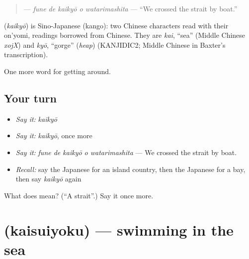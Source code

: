 \begin{quote}
\textbf{  } — \emph{fune de kaikyō o watarimashita} — \textquotedblleft{}We crossed the strait by boat.\textquotedblright{}
\end{quote}

\begin{cousinweb}
\textbf{} (\emph{kaikyō}) is Sino-Japanese (kango): two Chinese characters read with their on'yomi, readings borrowed from Chinese. They are \emph{kai}, \textquotedblleft{}sea\textquotedblright{} (Middle Chinese \emph{xojX}) and \emph{kyō}, \textquotedblleft{}gorge\textquotedblright{} (\emph{heap}) (KANJIDIC2; Middle Chinese in Baxter's transcription).
\end{cousinweb}

\begin{grammarlens}[title={What you've built}]
One more word for getting around.
\end{grammarlens}

\subsection*{Your turn}
\begin{itemize}
\raggedright
  \item \emph{Say it:} \emph{kaikyō}
  \item \emph{Say it:} \emph{kaikyō}, once more
  \item \emph{Say it:} \emph{fune de kaikyō o watarimashita} — We crossed the strait by boat.
  \item \emph{Recall:} say the Japanese for an island country, then the Japanese for a bay, then say \emph{kaikyō} again
\end{itemize}

\begin{tcolorbox}[breakable,colback=teal!4,colframe=teal!35!black,title={Before you move on}]
What does  mean? (\textquotedblleft{}A strait\textquotedblright{}.) Say it once more.
\end{tcolorbox}
\section[\texorpdfstring{\ja{かいすいよく} (kaisuiyoku)}{かいすいよく (kaisuiyoku)}]{ (kaisuiyoku) — swimming in the sea}

\label{lesson:JA-C383-kaisuiyoku}



